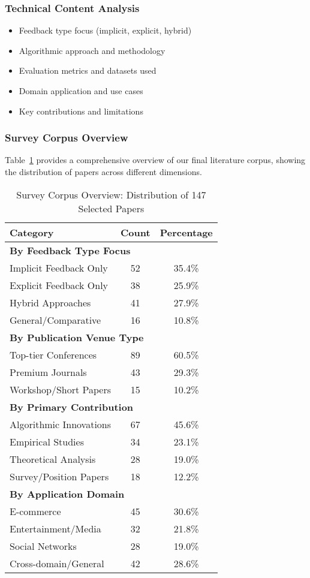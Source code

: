 \subsubsection{Technical Content Analysis}
\begin{itemize}
    \item Feedback type focus (implicit, explicit, hybrid)
    \item Algorithmic approach and methodology
    \item Evaluation metrics and datasets used
    \item Domain application and use cases
    \item Key contributions and limitations
\end{itemize}

\subsubsection{Survey Corpus Overview}
Table~\ref{tab:survey_corpus} provides a comprehensive overview of our final literature corpus, showing the distribution of papers across different dimensions.

\begin{table}[ht]
\centering
\caption{Survey Corpus Overview: Distribution of 147 Selected Papers}
\label{tab:survey_corpus}
\begin{tabular}{@{}lcc@{}}
\toprule
\textbf{Category} & \textbf{Count} & \textbf{Percentage} \\
\midrule
\multicolumn{3}{l}{\textbf{By Feedback Type Focus}} \\
Implicit Feedback Only & 52 & 35.4\% \\
Explicit Feedback Only & 38 & 25.9\% \\
Hybrid Approaches & 41 & 27.9\% \\
General/Comparative & 16 & 10.8\% \\
\midrule
\multicolumn{3}{l}{\textbf{By Publication Venue Type}} \\
Top-tier Conferences & 89 & 60.5\% \\
Premium Journals & 43 & 29.3\% \\
Workshop/Short Papers & 15 & 10.2\% \\
\midrule
\multicolumn{3}{l}{\textbf{By Primary Contribution}} \\
Algorithmic Innovations & 67 & 45.6\% \\
Empirical Studies & 34 & 23.1\% \\
Theoretical Analysis & 28 & 19.0\% \\
Survey/Position Papers & 18 & 12.2\% \\
\midrule
\multicolumn{3}{l}{\textbf{By Application Domain}} \\
E-commerce & 45 & 30.6\% \\
Entertainment/Media & 32 & 21.8\% \\
Social Networks & 28 & 19.0\% \\
Cross-domain/General & 42 & 28.6\% \\
\bottomrule
\end{tabular}
\end{table}

